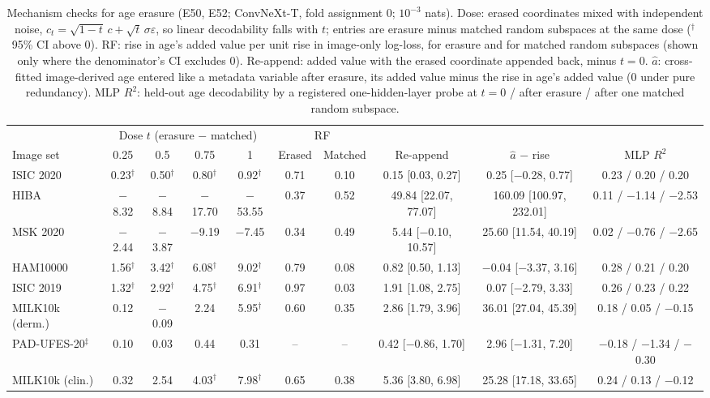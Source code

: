 \begin{table}[tp]\centering\footnotesize
\caption{Mechanism checks for age erasure (E50, E52; ConvNeXt-T, fold assignment 0; $10^{-3}$ nats). Dose: erased coordinates mixed with independent noise, $c_t=\sqrt{1-t}\,c+\sqrt t\,\sigma\varepsilon$, so linear decodability falls with $t$; entries are erasure minus matched random subspaces at the same dose ($^\dagger$95\% CI above 0). RF: rise in age's added value per unit rise in image-only log-loss, for erasure and for matched random subspaces (shown only where the denominator's CI excludes 0). Re-append: added value with the erased coordinate appended back, minus $t{=}0$. $\hat a$: cross-fitted image-derived age entered like a metadata variable after erasure, its added value minus the rise in age's added value (0 under pure redundancy). MLP $R^2$: held-out age decodability by a registered one-hidden-layer probe at $t=0$ / after erasure / after one matched random subspace.}\label{tab:apperasure}
\setlength{\tabcolsep}{2.5pt}
\begin{tabular}{lccccccccc}\toprule
 & \multicolumn{4}{c}{Dose $t$ (erasure $-$ matched)} & \multicolumn{2}{c}{RF} & & & \\\cmidrule(lr){2-5}\cmidrule(lr){6-7}
Image set & 0.25 & 0.5 & 0.75 & 1 & Erased & Matched & Re-append & $\hat a$ $-$ rise & MLP $R^2$\\\midrule
ISIC 2020 & 0.23$^\dagger$ & 0.50$^\dagger$ & 0.80$^\dagger$ & 0.92$^\dagger$ & 0.71 & 0.10 & 0.15 [0.03, 0.27] & 0.25 [\ensuremath{-}0.28, 0.77] & 0.23 / 0.20 / 0.20\\
HIBA & \ensuremath{-}8.32 & \ensuremath{-}8.84 & \ensuremath{-}17.70 & \ensuremath{-}53.55 & 0.37 & 0.52 & 49.84 [22.07, 77.07] & 160.09 [100.97, 232.01] & 0.11 / \ensuremath{-}1.14 / \ensuremath{-}2.53\\
MSK 2020 & \ensuremath{-}2.44 & \ensuremath{-}3.87 & \ensuremath{-}9.19 & \ensuremath{-}7.45 & 0.34 & 0.49 & 5.44 [\ensuremath{-}0.10, 10.57] & 25.60 [11.54, 40.19] & 0.02 / \ensuremath{-}0.76 / \ensuremath{-}2.65\\
HAM10000 & 1.56$^\dagger$ & 3.42$^\dagger$ & 6.08$^\dagger$ & 9.02$^\dagger$ & 0.79 & 0.08 & 0.82 [0.50, 1.13] & \ensuremath{-}0.04 [\ensuremath{-}3.37, 3.16] & 0.28 / 0.21 / 0.20\\
ISIC 2019 & 1.32$^\dagger$ & 2.92$^\dagger$ & 4.75$^\dagger$ & 6.91$^\dagger$ & 0.97 & 0.03 & 1.91 [1.08, 2.75] & 0.07 [\ensuremath{-}2.79, 3.33] & 0.26 / 0.23 / 0.22\\
MILK10k (derm.) & 0.12 & \ensuremath{-}0.09 & 2.24 & 5.95$^\dagger$ & 0.60 & 0.35 & 2.86 [1.79, 3.96] & 36.01 [27.04, 45.39] & 0.18 / 0.05 / \ensuremath{-}0.15\\
PAD-UFES-20$^\ddagger$ & 0.10 & 0.03 & 0.44 & 0.31 & -- & -- & 0.42 [\ensuremath{-}0.86, 1.70] & 2.96 [\ensuremath{-}1.31, 7.20] & \ensuremath{-}0.18 / \ensuremath{-}1.34 / \ensuremath{-}0.30\\
MILK10k (clin.) & 0.32 & 2.54 & 4.03$^\dagger$ & 7.98$^\dagger$ & 0.65 & 0.38 & 5.36 [3.80, 6.98] & 25.28 [17.18, 33.65] & 0.24 / 0.13 / \ensuremath{-}0.12\\
\bottomrule\end{tabular}\end{table}
